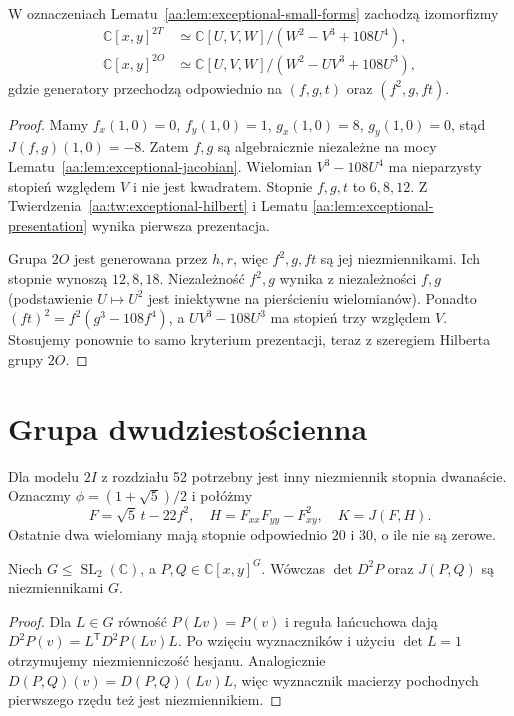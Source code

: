 \begin{twierdzenie}
\label{aa:tw:exceptional-e6-e7}
W oznaczeniach Lematu~\ref{aa:lem:exceptional-small-forms}
zachodzą izomorfizmy
\[
\begin{aligned}
 \mathbb C[x,y]^{2T}
 &\simeq\mathbb C[U,V,W]/(W^2-V^3+108U^4),\\
 \mathbb C[x,y]^{2O}
 &\simeq\mathbb C[U,V,W]/(W^2-UV^3+108U^3),
\end{aligned}
\]
gdzie generatory przechodzą odpowiednio na $(f,g,t)$
oraz $(f^2,g,ft)$.
\end{twierdzenie}
\begin{proof}
Mamy $f_x(1,0)=0$, $f_y(1,0)=1$,
$g_x(1,0)=8$, $g_y(1,0)=0$, stąd
$J(f,g)(1,0)=-8$. Zatem $f,g$ są algebraicznie
niezależne na mocy Lematu~\ref{aa:lem:exceptional-jacobian}.
Wielomian $V^3-108U^4$ ma nieparzysty stopień względem
$V$ i nie jest kwadratem. Stopnie $f,g,t$ to $6,8,12$.
Z Twierdzenia~\ref{aa:tw:exceptional-hilbert} i Lematu
\ref{aa:lem:exceptional-presentation} wynika pierwsza
prezentacja.

Grupa $2O$ jest generowana przez $h,r$, więc
$f^2,g,ft$ są jej niezmiennikami. Ich stopnie
wynoszą $12,8,18$. Niezależność $f^2,g$ wynika
z niezależności $f,g$ (podstawienie $U\mapsto U^2$
jest iniektywne na pierścieniu wielomianów).
Ponadto $(ft)^2=f^2(g^3-108f^4)$, a
$UV^3-108U^3$ ma stopień trzy względem $V$.
Stosujemy ponownie to samo kryterium prezentacji,
teraz z szeregiem Hilberta grupy $2O$.
\end{proof}

\section{Grupa dwudziestościenna}

Dla modelu $2I$ z rozdziału 52 potrzebny jest
inny niezmiennik stopnia dwanaście.
Oznaczmy $\phi=(1+\sqrt5)/2$ i połóżmy
\[
 F=\sqrt5\,t-22f^2,\quad
 H=F_{xx}F_{yy}-F_{xy}^2,\quad K=J(F,H).
\]
Ostatnie dwa wielomiany mają stopnie odpowiednio
$20$ i $30$, o ile nie są zerowe.

\begin{lemat}
\label{aa:lem:exceptional-covariants}
Niech $G\le\operatorname{SL}_2(\mathbb C)$,
a $P,Q\in\mathbb C[x,y]^G$. Wówczas
$\det D^2P$ oraz $J(P,Q)$ są niezmiennikami $G$.
\end{lemat}
\begin{proof}
Dla $L\in G$ równość $P(Lv)=P(v)$ i reguła
łańcuchowa dają
$D^2P(v)=L^{\mathsf T}D^2P(Lv)L$.
Po wzięciu wyznaczników i użyciu $\det L=1$
otrzymujemy niezmienniczość hesjanu. Analogicznie
$D(P,Q)(v)=D(P,Q)(Lv)L$, więc wyznacznik
macierzy pochodnych pierwszego rzędu też jest
niezmiennikiem.
\end{proof}

